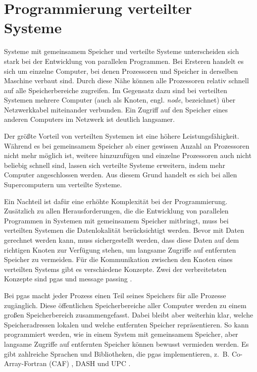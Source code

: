 \section{Programmierung verteilter Systeme}
\label{sec:programmierung_verteilter_systeme}

Systeme mit gemeinsamem Speicher und verteilte Systeme unterscheiden sich stark bei der Entwicklung von parallelen Programmen.
Bei Ersteren handelt es sich um einzelne Computer,
bei denen Prozessoren und Speicher in derselben Maschine verbaut sind.
Durch diese Nähe können alle Prozessoren relativ schnell auf alle Speicherbereiche zugreifen.
Im Gegensatz dazu sind bei verteilten Systemen mehrere Computer (auch als Knoten, engl. \textit{node}, bezeichnet) über Netzwerkkabel miteinander verbunden.
Ein Zugriff auf den Speicher eines anderen Computers im Netzwerk ist deutlich langsamer.

Der größte Vorteil von verteilten Systemen ist eine höhere Leistungsfähigkeit.
Während es bei gemeinsamem Speicher ab einer gewissen Anzahl an Prozessoren nicht mehr möglich ist,
weitere hinzuzufügen und einzelne Prozessoren auch nicht beliebig schnell sind,
lassen sich verteilte Systeme erweitern,
indem mehr Computer angeschlossen werden.
Aus diesem Grund handelt es sich bei allen Supercomputern um verteilte Systeme.

Ein Nachteil ist dafür eine erhöhte Komplexität bei der Programmierung.
Zusätzlich zu allen Herausforderungen,
die die Entwicklung von parallelen Programmen in Systemen mit gemeinsamem Speicher mitbringt,
muss bei verteilten Systemen die Datenlokalität berücksichtigt werden.
Bevor mit Daten gerechnet werden kann,
muss sichergestellt werden,
dass diese Daten auf dem richtigen Knoten zur Verfügung stehen,
um langsame Zugriffe auf entfernten Speicher zu vermeiden.
% 
Für die Kommunikation zwischen den Knoten eines verteilten Systems gibt es verschiedene Konzepte.
Zwei der verbreitetsten Konzepte sind \gls{pgas} \cite{PGAS} und \gls{message passing} \cite{MPI-3.1}.

Bei \gls{pgas} macht jeder Prozess einen Teil seines Speichers für alle Prozesse zugänglich.
Diese öffentlichen Speicherbereiche aller Computer werden zu einem großen Speicherbereich zusammengefasst.
Dabei bleibt aber weiterhin klar,
welche Speicheradressen lokalen und welche entfernten Speicher repräsentieren.
So kann programmiert werden,
wie in einem System mit gemeinsamem Speicher,
aber langsame Zugriffe auf entfernten Speicher können bewusst vermieden werden.
Es gibt zahlreiche Sprachen und Bibliotheken,
die \gls{pgas} implementieren,
z.~B. Co-Array-Fortran (CAF) \cite{Co-Array-Fortran}, DASH \cite{DASH} und UPC \cite{UPC}.

